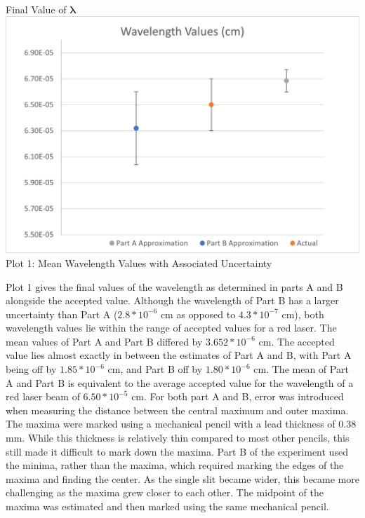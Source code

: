 \begin{center}
    \vspace{3mm}
    \\Final Value of $\bm{\lambda}$\\
    \vspace{5mm}
    \includegraphics*[]{Wavelength Values.jpg}
    \\Plot 1: Mean Wavelength Values with Associated Uncertainty
\end{center}
Plot 1 gives the final values of the wavelength as determined in parts A and B alongside the accepted value. 
Although the wavelength of Part B has a larger uncertainty than Part A ($2.8*10^{-6}$ cm as opposed to $4.3*10^{-7}$ cm), both wavelength values lie within the range of accepted values for a red laser.
The mean values of Part A and Part B differed by $3.652*10^{-6}$ cm. The accepted value lies almost exactly in between the estimates of Part A and B, with Part A being off by $1.85*10^{-6}$ cm, and Part B off by $1.80*10^{-6}$ cm.
The mean of Part A and Part B is equivalent to the average accepted value for the wavelength of a red laser beam of $6.50*10^{-5}$ cm.
For both part A and B, error was introduced when measuring the distance between the central maximum and outer maxima. The maxima were marked using a mechanical pencil with a lead thickness of 0.38 mm. 
While this thickness is relatively thin compared to most other pencils, this still made it difficult to mark down the maxima. 
Part B of the experiment used the minima, rather than the maxima, which required marking the edges of the maxima and finding the center. 
As the single slit became wider, this became more challenging as the maxima grew closer to each other. 
The midpoint of the maxima was estimated and then marked using the same mechanical pencil.
